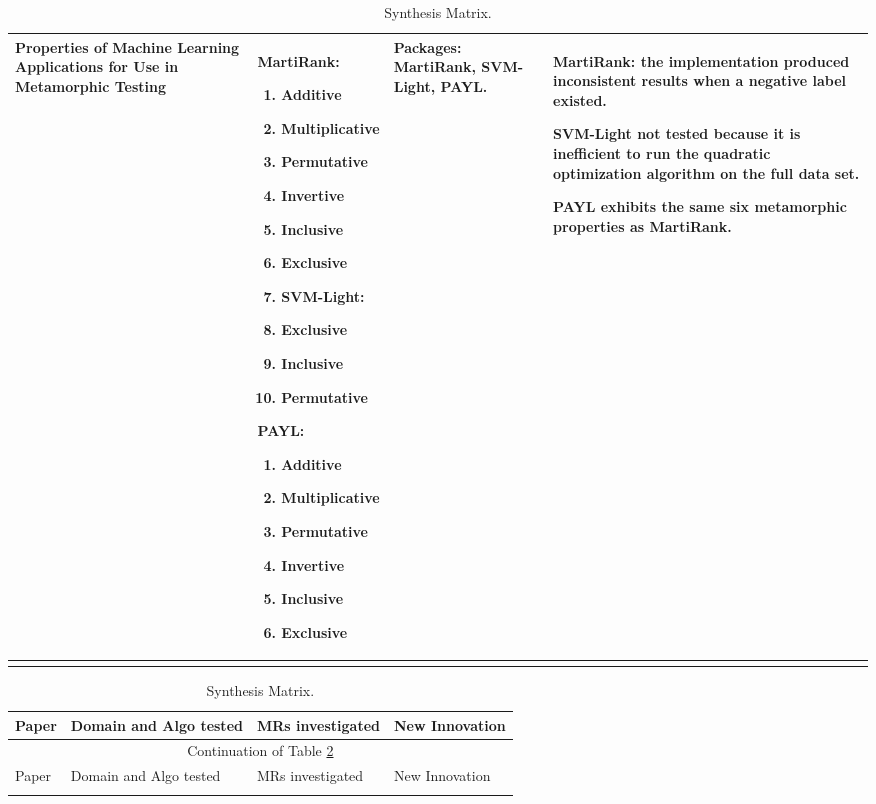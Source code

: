 \begin{singlespace}
\begin{longtable}[c]{| p{3cm} | p{5.5cm} | p{3cm} | p{3cm} |}
  Properties of Machine Learning Applications for Use in Metamorphic Testing &
  MartiRank:
  \begin{enumerate}
   \item Additive
   \item Multiplicative
   \item Permutative
   \item Invertive
   \item Inclusive
   \item Exclusive
   \item SVM-Light:
   \item Exclusive
   \item Inclusive
   \item Permutative
  \end{enumerate}
  \par\medskip
  PAYL:
  \begin{enumerate}
   \item Additive
   \item Multiplicative
   \item Permutative
   \item Invertive
   \item Inclusive
   \item Exclusive
  \end{enumerate}                                                  &
  Packages: MartiRank, SVM-Light, PAYL.                                      &
  MartiRank: the implementation produced inconsistent results when a negative label existed.\par\medskip
  SVM-Light not tested because it is inefficient to run the quadratic optimization algorithm on the full data set.\par\medskip
  PAYL exhibits the same six metamorphic properties as MartiRank.                                                              \\

  \hline

  \caption{Synthesis Matrix.\label{long}}
 \end{longtable}

 \begin{longtable}[c]{| p{3cm} | p{4cm} | p{3.5cm} | p{4cm} |}
  \hline

  Paper & Domain and Algo tested  & MRs investigated & New Innovation \\
  \hline
  \endfirsthead
  \hline
  \multicolumn{4}{|c|}{Continuation of Table \ref{long}}                                                                       \\
  \hline
  Paper & Domain and Algo tested  & MRs investigated & New Innovation \\
  \hline
  \endhead
  \caption{Synthesis Matrix.\label{long}}
  \endfoot


\end{longtable}
\end{singlespace}
